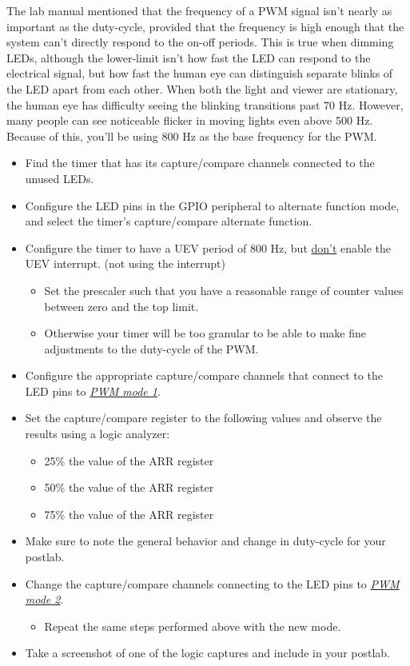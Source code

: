 \documentclass[11pt,fleqn]{book} %
\begin{document}
The lab manual mentioned that the frequency of a PWM signal isn't nearly as important as the duty-cycle, provided that the frequency is high enough that the system can't directly respond to the on-off periods. This is true when dimming LEDs, although the lower-limit isn't how fast the LED can respond to the electrical signal, but how fast the human eye can distinguish separate blinks of the LED apart from each other.
When both the light and viewer are stationary, the human eye has difficulty seeing the blinking transitions past 70 Hz. However, many people can see noticeable flicker in moving lights even above 500 Hz. Because of this, you'll be using 800 Hz as the base frequency for the PWM. 

\begin{itemize}
    \item Find the timer that has its capture/compare channels connected to the unused LEDs. 
    \item Configure the LED pins in the GPIO peripheral to alternate function mode, and select the timer's capture/compare alternate function.
    \item Configure the timer to have a UEV period of 800 Hz, but \underline{don't} enable the UEV interrupt. (not using the interrupt)  
    \begin{itemize}
        \item Set the prescaler such that you have a reasonable range of counter values between zero and the top limit. 
        \item Otherwise your timer will be too granular to be able to make fine adjustments to the duty-cycle of the PWM.
    \end{itemize}
    
    \item Configure the appropriate capture/compare channels that connect to the LED pins to \underline{\textit{PWM mode 1}}. 
    \item Set the capture/compare register to the following values and observe the results using a logic analyzer:
    \begin{itemize}
        \item 25\% the value of the ARR register
        \item 50\% the value of the ARR register
        \item 75\% the value of the ARR register
    \end{itemize}
    \item Make sure to note the general behavior and change in duty-cycle for your postlab.
    \item Change the capture/compare channels connecting to the LED pins to \underline{\textit{PWM mode 2}}.  
    \begin{itemize}
        \item Repeat the same steps performed above with the new mode.
    \end{itemize}   
    \item Take a screenshot of one of the logic captures and include in your postlab. 
\end{itemize}
\end{document}
